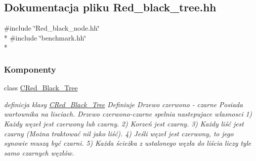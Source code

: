 \hypertarget{_red__black__tree_8hh}{}\subsection{Dokumentacja pliku Red\+\_\+black\+\_\+tree.\+hh}
\label{_red__black__tree_8hh}
{\ttfamily \#include \char`\"{}Red\+\_\+black\+\_\+node.\+hh\char`\"{}}\\*
{\ttfamily \#include \char`\"{}benchmark.\+hh\char`\"{}}\\*
\subsubsection*{Komponenty}
\begin{DoxyCompactItemize}
\item 
class \hyperlink{class_c_red___black___tree}{C\+Red\+\_\+\+Black\+\_\+\+Tree}
\begin{DoxyCompactList}\small\item\em definicja klasy \hyperlink{class_c_red___black___tree}{C\+Red\+\_\+\+Black\+\_\+\+Tree} Definiuje Drzewo czerwono -\/ czarne Posiada wartownika na lisciach. Drzewo czerwono-\/czarne spelnia nastepujace wlasnosci 1) Każdy węzeł jest czerwony lub czarny. 2) Korzeń jest czarny. 3) Każdy liść jest czarny (Można traktować nil jako liść). 4) Jeśli węzeł jest czerwony, to jego synowie muszą być czarni. 5) Każda ścieżka z ustalonego węzła do liścia liczy tyle samo czarnych węzłów. \end{DoxyCompactList}\end{DoxyCompactItemize}
